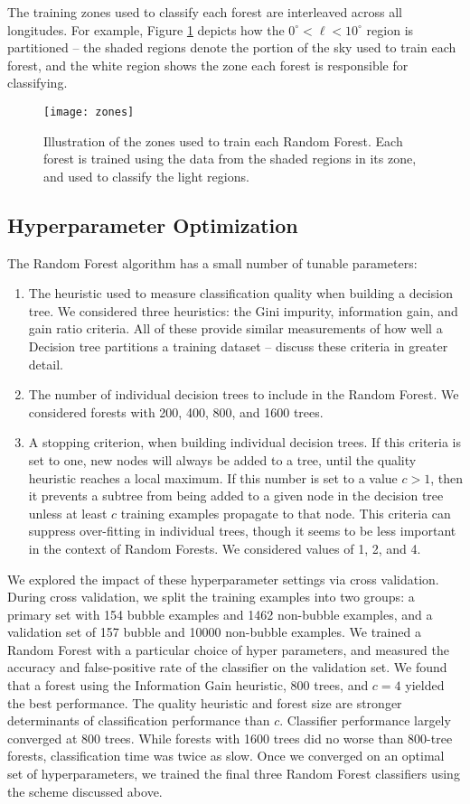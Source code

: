 \documentclass[preprint]{aastex}
\begin{document}
The training zones used to classify each forest are interleaved across all longitudes. For example, Figure \ref{fig:zone} depicts how the $0^\circ < \ell < 10^\circ$ region is partitioned -- the shaded regions denote the portion of the sky used to train each forest, and the white region shows the zone each forest is responsible for classifying.

\begin{figure}[h!]
\texttt{[image: zones]}
\caption{Illustration of the zones used to train each Random Forest. Each forest is trained using the data from the shaded regions in its zone, and used to classify the light regions.}
\label{fig:zone}
\end{figure}

\subsection{Hyperparameter Optimization}
The Random Forest algorithm has a small number of tunable parameters:

\begin{enumerate}
\item  The heuristic used to measure classification quality when building a decision tree. We considered three heuristics: the Gini impurity, information gain, and gain ratio criteria. All of these provide similar measurements of how well a Decision tree partitions a training dataset -- \citep{Ivezic14} discuss these criteria in greater detail.
\item The number of individual decision trees to include in the Random Forest. We considered forests with 200, 400, 800, and 1600 trees.
\item A stopping criterion, when building individual decision trees. If this criteria is set to one, new nodes will always be added to a tree, until the quality heuristic reaches a local maximum. If this number is set to a value $c > 1$, then it prevents a subtree from being added to a given node in the decision tree unless at least $c$ training examples propagate to that node. This criteria can suppress over-fitting in individual trees, though it seems to be less important in the context of Random Forests. We considered values of 1, 2, and 4.
\end{enumerate}

We explored the impact of these hyperparameter settings via cross validation. During cross validation, we split the training examples into two groups: a primary set with 154 bubble examples and 1462 non-bubble examples, and a validation set of 157 bubble and 10000 non-bubble examples. We trained a Random Forest with a particular choice of hyper parameters, and measured the accuracy and false-positive rate of the classifier on the validation set. We found that a forest using the Information Gain heuristic, 800 trees, and $c=4$ yielded the best performance. The quality heuristic and forest size are stronger determinants of classification performance than $c$. Classifier performance largely converged at 800 trees. While forests with 1600 trees did no worse than 800-tree forests, classification time was twice as slow. Once we converged on an optimal set of hyperparameters, we trained the final three Random Forest classifiers using the scheme discussed above.
\end{document}
